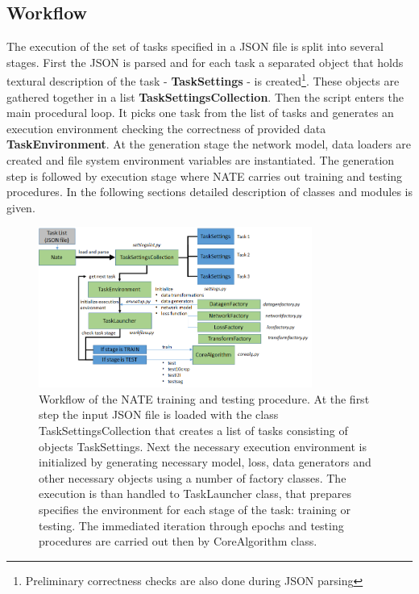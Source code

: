 \documentclass[a4paper, 11pt]{article}
\begin{document}
\subsection{Workflow}
The execution of the set of tasks specified in a JSON file is split into several stages. First the JSON is parsed and for each task a separated object that holds textural description of the task - \textbf{TaskSettings} - is created\footnote{Preliminary correctness checks are also done during JSON parsing}. 
These objects are gathered together in a list \textbf{TaskSettingsCollection}. Then the script enters the main procedural loop. It picks one task from the list of tasks and generates an execution environment checking the correctness of provided data \textbf{TaskEnvironment}. At the generation stage the network model, data loaders are created and file system environment variables are instantiated. The generation step is followed by execution stage where NATE carries out training and testing procedures. In the following sections detailed description of classes and modules is given.
\begin{figure}
    \centering
    \includegraphics[width=0.8\textwidth]{img/schemenate1.png} 
    \caption{Workflow of the NATE training and testing procedure. At the first step the input JSON file is loaded with the class TaskSettingsCollection that creates a list of tasks consisting of objects TaskSettings. Next the necessary execution environment is initialized by generating necessary model, loss, data generators and other necessary objects using a number of factory classes. The execution is than handled to TaskLauncher class, that prepares specifies the environment for each stage of the task: training or testing. The immediated iteration through epochs and testing procedures are carried out then by CoreAlgorithm class.}
    \label{fig:my_label}
\end{figure}

\end{document}
